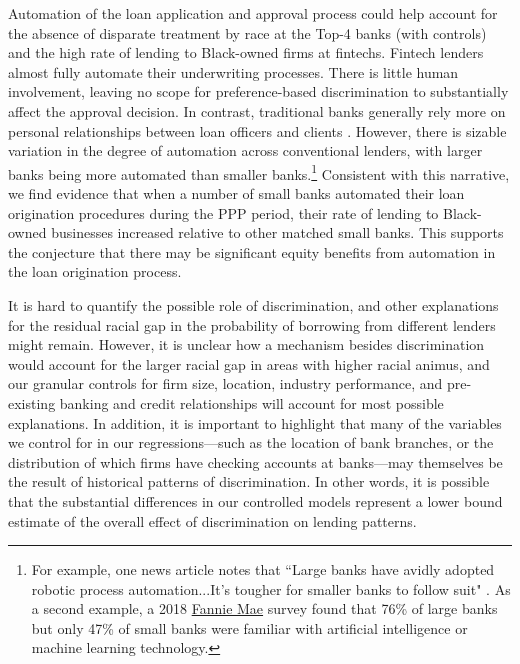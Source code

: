 \documentclass[11pt]{article}
\begin{document}
Automation of the loan application and approval process could help account for the absence of disparate treatment by race at the Top-4 banks (with controls) and the high rate of lending to Black-owned firms at fintechs. Fintech lenders almost fully automate their underwriting processes. There is little human involvement, leaving no scope for preference-based discrimination to substantially affect the approval decision. In contrast, traditional banks generally rely more on personal relationships between loan officers and clients \citep{petersen1994benefits,berger2011bank}. However, there is sizable variation in the degree of automation across conventional lenders, with larger banks being more automated than smaller banks.\footnote{For example, one news article notes that ``Large banks have avidly adopted robotic process automation...It's tougher for smaller banks to follow suit" \citep{Crosman2020}. As a second example, a 2018 \href{https://www.fanniemae.com/media/20256/display}{Fannie Mae} survey found that 76\% of large banks but only 47\% of small banks were familiar with artificial intelligence or machine learning technology.} Consistent with this narrative, we find evidence that when a number of small banks automated their loan origination procedures during the PPP period, their rate of lending to Black-owned businesses increased relative to other matched small banks. This supports the conjecture that there may be significant equity benefits from automation in the loan origination process.

It is hard to quantify the possible role of discrimination, and other explanations for the residual racial gap in the probability of borrowing from different lenders might remain. However, it is unclear how a mechanism besides discrimination would account for the larger racial gap in areas with higher racial animus, and our granular controls for firm size, location, industry performance, and pre-existing banking and credit relationships will account for most possible explanations. In addition, it is important to highlight that many of the variables we control for in our regressions---such as the location of bank branches, or the distribution of which firms have checking accounts at banks---may themselves be the result of historical patterns of discrimination. In other words, it is possible that the substantial differences in our controlled models represent a lower bound estimate of the overall effect of discrimination on lending patterns. 
\end{document}
